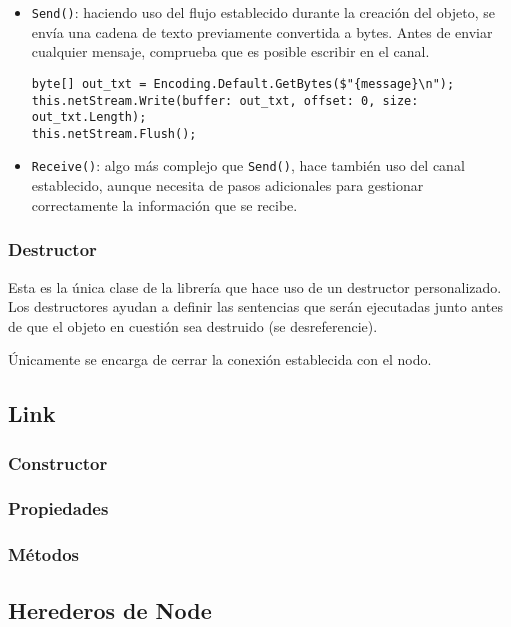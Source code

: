 \begin{itemize}
\item \texttt{Send()}: haciendo uso del flujo establecido durante la creación del objeto, se envía una cadena de texto previamente convertida a bytes. Antes de enviar cualquier mensaje, comprueba que es posible escribir en el canal.

\begin{lstlisting}[language={[Sharp]C}, caption={Envío de mensajes a un nodo}, label={node3}]
byte[] out_txt = Encoding.Default.GetBytes($"{message}\n");
this.netStream.Write(buffer: out_txt, offset: 0, size: out_txt.Length);
this.netStream.Flush();
\end{lstlisting}

\item \texttt{Receive()}: algo más complejo que \texttt{Send()}, hace también uso del canal establecido, aunque necesita de pasos adicionales para gestionar correctamente la información que se recibe.

\end{itemize}

\subsubsection{Destructor}
Esta es la única clase de la librería que hace uso de un destructor personalizado. Los destructores ayudan a definir las sentencias que serán ejecutadas junto antes de que el objeto en cuestión sea destruido (se desreferencie).

Únicamente se encarga de cerrar la conexión establecida con el nodo.

\subsection{Link}
\subsubsection{Constructor}
\subsubsection{Propiedades}
\subsubsection{Métodos}

\subsection{Herederos de Node}

